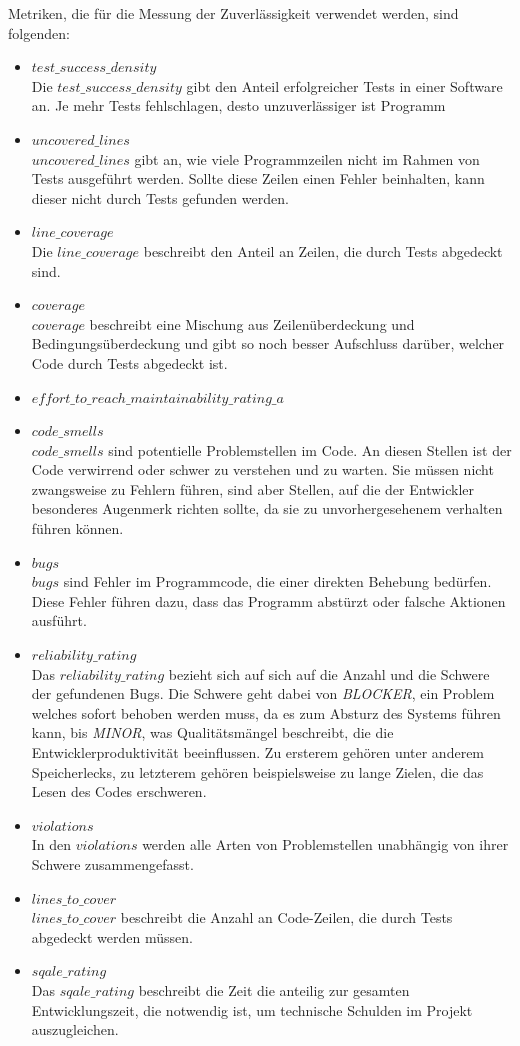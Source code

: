 \documentclass[
	oneside,  %
	ngerman, 
	final, 
	11pt, 
	a4paper, 
	1.1headlines, 
	headinclude=false, 
	footinclude=false, 
	mpinclude=false, 
	pagesize, 
	onecolumn, 
	titlepage, 
	parskip=half, 
	headsepline, 
	chapterprefix=false, 
	version=first, 
	listof=totoc, 
	bibliography=totoc, 
	toc=graduated, 
	fleqn
]{scrbook}
\begin{document}
Metriken, die für die Messung der Zuverlässigkeit verwendet werden, sind folgenden:
\begin{itemize}
	\item $test\_success\_density$\\
	Die $test\_success\_density$ gibt den Anteil erfolgreicher Tests in einer Software an.
	Je mehr Tests fehlschlagen, desto unzuverlässiger ist Programm 
	\item $uncovered\_lines$\\
	$uncovered\_lines$ gibt an, wie viele Programmzeilen nicht im Rahmen von Tests ausgeführt werden.
	Sollte diese Zeilen einen Fehler beinhalten, kann dieser nicht durch Tests gefunden werden.
	\item $line\_coverage$\\
	Die $line\_coverage$ beschreibt den Anteil an Zeilen, die durch Tests abgedeckt sind.
	\item $coverage$\\
	$coverage$ beschreibt eine Mischung aus Zeilenüberdeckung und Bedingungsüberdeckung und gibt so noch besser Aufschluss darüber, welcher Code durch Tests abgedeckt ist.
	\item $effort\_to\_reach\_maintainability\_rating\_a$ %
	\item $code\_smells$\\
	$code\_smells$ sind potentielle Problemstellen im Code.
	An diesen Stellen ist der Code verwirrend oder schwer zu verstehen und zu warten.
	Sie müssen nicht zwangsweise zu Fehlern führen, sind aber Stellen, auf die der Entwickler besonderes Augenmerk richten sollte, da sie zu unvorhergesehenem verhalten führen können.
	\item $bugs$\\
	$bugs$ sind Fehler im Programmcode, die einer direkten Behebung bedürfen.
	Diese Fehler führen dazu, dass das Programm abstürzt oder falsche Aktionen ausführt.
	\item $reliability\_rating$\\
	Das $reliability\_rating$ bezieht sich auf sich auf die Anzahl und die Schwere der gefundenen Bugs.
	Die Schwere geht dabei von \textit{BLOCKER}, ein Problem welches sofort behoben werden muss, da es zum Absturz des Systems führen kann, bis \textit{MINOR}, was Qualitätsmängel beschreibt, die die Entwicklerproduktivität beeinflussen.
	Zu ersterem gehören unter anderem Speicherlecks, zu letzterem gehören beispielsweise zu lange Zielen, die das Lesen des Codes erschweren.
	\item $violations$\\
	In den $violations$ werden alle Arten von Problemstellen unabhängig von ihrer Schwere zusammengefasst.
	\item $lines\_to\_cover$\\
	$lines\_to\_cover$ beschreibt die Anzahl an Code-Zeilen, die durch Tests abgedeckt werden müssen.
	\item $sqale\_rating$\\
	Das $sqale\_rating$ beschreibt die Zeit die anteilig zur gesamten Entwicklungszeit, die notwendig ist, um technische Schulden im Projekt auszugleichen.
\end{itemize}
\end{document}
